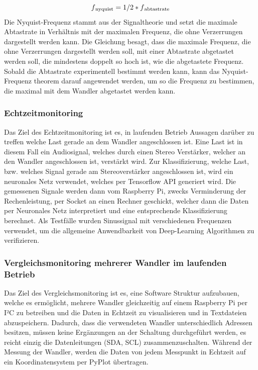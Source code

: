 \begin{equation}
\label{Nyquist}
f\textsubscript{nyquist} = 1/2 * f\textsubscript{abtastrate}
\end{equation}
Die Nyquist-Frequenz stammt aus der Signaltheorie und setzt die maximale Abtastrate in Verhältnis mit der maximalen Frequenz, die ohne Verzerrungen dargestellt werden kann. Die Gleichung besagt, dass die maximale Frequenz, die ohne Verzerrungen dargestellt werden soll, mit einer Abtastrate abgetastet werden soll, die mindestens doppelt so hoch ist, wie die abgetastete Frequenz. Sobald die Abtastrate experimentell bestimmt werden kann, kann das Nyquist-Frequenz theorem darauf angewendet werden, um so die Frequenz zu bestimmen, die maximal mit dem Wandler abgetastet werden kann. 



\subsubsection{Echtzeitmonitoring}
Das Ziel des Echtzeitmonitoring ist es, in laufenden Betrieb Aussagen darüber zu treffen welche Last gerade an dem Wandler angeschlossen ist. Eine Last ist in diesem Fall ein Audiosignal, welches durch einen Stereo Verstärker, welcher an den Wandler angeschlossen ist, verstärkt wird.  Zur Klassifizierung, welche Last, bzw. welches Signal gerade am Stereoverstärker angeschlossen ist, wird ein neuronales Netz verwendet, welches per Tensorflow API generiert wird. Die gemessenen Signale werden dann vom Raspberry Pi, zwecks Verminderung der Rechenleistung, per Socket an einen Rechner geschickt, welcher dann die Daten per Neuronales Netz interpretiert und eine entsprechende Klassifizierung berechnet. Als Testfälle wurden Sinussignal mit verschiedenen Frequenzen verwendet, um die allgemeine Anwendbarkeit von Deep-Learning Algorithmen zu verifizieren. 


\subsubsection{Vergleichsmonitoring mehrerer Wandler im laufenden Betrieb}

Das Ziel des Vergleichsmonitoring ist es, eine Software Struktur aufzubauen, welche es ermöglicht, mehrere Wandler gleichzeitig auf einem Raspberry Pi per I²C zu betreiben und die Daten in Echtzeit zu visualisieren und in Textdateien abzuspeichern. Dadurch, dass die verwendeten Wandler unterschiedlich Adressen besitzen, müssen keine Ergänzungen an der Schaltung durchgeführt werden, es reicht einzig die Datenleitungen (SDA, SCL) zusammenzuschalten. Während der Messung der Wandler, werden die Daten von jedem Messpunkt in Echtzeit auf ein Koordinatensystem per PyPlot übertragen. 


